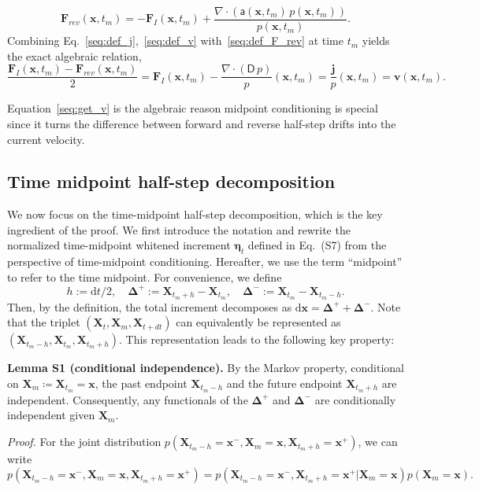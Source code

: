 \documentclass[
 longbibliography,
 twocolumn,
 superscriptaddress,
 amsmath,
 amssymb,
 amsthm,
 amsfonts,
 prl,
 floatfix,
]{revtex4-2}
\newcommand{\matbf}[1]{\boldsymbol{\mathsf{#1}}}
\begin{document}
\begin{widetext}
\begin{equation}
    \bm{F}_{rev}(\bm{x},t_m)=-
    \bm{F}_I(\bm{x},t_m)+
    \frac{\nabla\cdot(\matbf{a}(\bm{x},t_m)\,p(\bm{x},t_m))}{p(\bm{x},t_m)}.
    \label{seq:def_F_rev}
\end{equation}
Combining Eq.~\eqref{seq:def_j},~\eqref{seq:def_v} with~\eqref{seq:def_F_rev} at time $t_m$ yields the exact algebraic relation,
\begin{equation}
    \frac{\bm{F}_I(\bm{x},t_m)-\bm{F}_{rev}(\bm{x},t_m)}{2}=
    \bm{F}_I(\bm{x},t_m)-
    \frac{\nabla\cdot(\matbf{D}\,p)}{p}(\bm{x},t_m)=
    \frac{\bm{j}}{p}(\bm{x},t_m)=\bm{v}(\bm{x},t_m).
    \label{seq:get_v}
\end{equation}

Equation~\eqref{seq:get_v} is the algebraic reason midpoint conditioning is special since it turns the difference between forward and reverse half-step drifts into the current velocity.

\subsection{Time midpoint half-step decomposition}
\vspace*{-0.8\baselineskip}
We now focus on the time-midpoint half-step decomposition, which is the key ingredient of the proof. 
We first introduce the notation and rewrite the normalized time-midpoint whitened increment $\bm\eta_t$ defined in Eq.~(S7) from the perspective of time-midpoint conditioning. 
Hereafter, we use the term ``midpoint'' to refer to the time midpoint. 
For convenience, we define
\[
h := \mathrm{d}t/2, \quad \bm\Delta^+ := \bm{X}_{t_m+h} - \bm{X}_{t_m}, \quad \bm\Delta^- := \bm{X}_{t_m} - \bm{X}_{t_m-h}.
\]
Then, by the definition, the total increment decomposes as $\mathrm{d}\bm{x} = \bm\Delta^+ + \bm\Delta^-$.  
Note that the triplet $(\bm{X}_t, \bm{X}_m, \bm{X}_{t+dt})$ can equivalently be represented as $(\bm{X}_{t_m-h}, \bm{X}_{t_m}, \bm{X}_{t_m+h})$. 
This representation leads to the following key property:

\hypertarget{lem:S1}{}
\textbf{Lemma S1 (conditional independence).} By the Markov property, conditional on $\bm{X}_m\coloneq\bm{X}_{t_m}=\bm{x}$, the past endpoint $\bm{X}_{t_m-h}$ and the future endpoint $\bm{X}_{t_m+h}$ are independent. Consequently, any functionals of the $\bm\Delta^+$ and $\bm\Delta^-$ are conditionally independent given $\bm{X}_m$.

\textit{Proof.} For the joint distribution $p(\bm{X}_{t_m-h}=\bm{x}^-,\bm{X}_m=\bm{x},\bm{X}_{t_m+h}=\bm{x}^+)$, we can write
\begin{equation*}
    p(\bm{X}_{t_m-h}=\bm{x}^-,\bm{X}_m=\bm{x},\bm{X}_{t_m+h}=\bm{x}^+)=p(\bm{X}_{t_m-h}=\bm{x}^-,\bm{X}_{t_m+h}=\bm{x}^+|\bm{X}_m=\bm{x})p(\bm{X}_m=\bm{x}).
\end{equation*}


\end{widetext}
\end{document}
